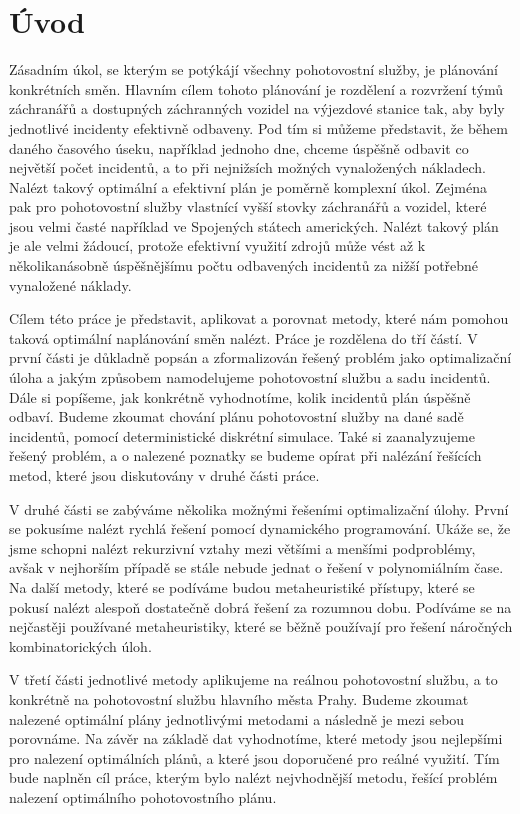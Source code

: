 \chapter*{Úvod}

Zásadním úkol, se kterým se potýkájí všechny pohotovostní služby, je plánování konkrétních směn.
Hlavním cílem tohoto plánování je rozdělení a rozvržení týmů záchranářů a dostupných záchranných vozidel na výjezdové stanice tak, aby byly jednotlivé incidenty efektivně odbaveny. 
Pod tím si můžeme představit, že během daného časového úseku, například jednoho dne, chceme úspěšně odbavit co největší počet incidentů, a to při nejnižsích možných vynaložených nákladech.
Nalézt takový optimální a efektivní plán je poměrně komplexní úkol. Zejména pak pro pohotovostní služby
vlastnící vyšší stovky záchranářů a vozidel, které jsou velmi časté například ve Spojených státech amerických. 
Nalézt takový plán je ale velmi žádoucí, protože efektivní využití zdrojů může vést až k několikanásobně úspěšnějšímu
počtu odbavených incidentů za nižší potřebné vynaložené náklady.

Cílem této práce je představit, aplikovat a porovnat metody, které nám pomohou taková optimální naplánování směn nalézt. 
Práce je rozdělena do tří částí.
V první části je důkladně popsán a zformalizován řešený problém jako optimalizační úloha a jakým způsobem namodelujeme pohotovostní službu a sadu incidentů.
Dále si popíšeme, jak konkrétně vyhodnotíme, kolik incidentů plán úspěšně odbaví.
Budeme zkoumat chování plánu pohotovostní služby na dané sadě incidentů, pomocí deterministické diskrétní simulace.
Také si zaanalyzujeme řešený problém, a o nalezené poznatky se budeme opírat při nalézání řešících metod, které jsou diskutovány v druhé části práce.

V druhé části se zabýváme několika možnými řešeními optimalizační úlohy.
První se pokusíme nalézt rychlá řešení pomocí dynamického programování.
Ukáže se, že jsme schopni nalézt rekurzivní vztahy mezi většími a menšími podproblémy, avšak v nejhorším případě se stále nebude jednat o řešení v polynomiálním čase.
Na další metody, které se podíváme budou metaheuristiké přístupy, které se pokusí nalézt alespoň dostatečně dobrá řešení za rozumnou dobu.
Podíváme se na nejčastěji používané metaheuristiky, které se běžně používají pro řešení náročných kombinatorických úloh.

V třetí části jednotlivé metody aplikujeme na reálnou pohotovostní službu, a to konkrétně na pohotovostní službu hlavního města Prahy.
Budeme zkoumat nalezené optimální plány jednotlivými metodami a následně je mezi sebou porovnáme.
Na závěr na základě dat vyhodnotíme, které metody jsou nejlepšími pro nalezení optimálních plánů, a které jsou doporučené pro reálné využití.
Tím bude naplněn cíl práce, kterým bylo nalézt nejvhodnější metodu, řešící problém nalezení optimálního pohotovostního plánu. 


